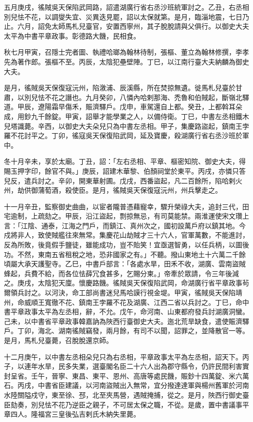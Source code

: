 \begin{pinyinscope}
 五月庚戌，徭賊吳天保陷武岡路，詔遣湖廣行省右丞沙班統軍討之。乙丑，右丞相別兒怯不花，以調燮失宜、災異迭見罷，詔以太保就第。是月，臨淄地震，七日乃止。六月，詔免太師馬札兒臺官，安置西寧州，其子脫脫請與父俱行。以御史大夫太平為中書平章政事。彰德路大饑，民相食。



 秋七月甲寅，召隱士完者圖、執禮哈瑯為翰林待制，張樞、董立為翰林修撰，李孝先為著作郎。張樞不至。丙辰，太陰犯壘壁陣。丁巳，以江南行臺大夫納麟為御史大夫。



 是月，徭賊吳天保復寇沅州，陷漵浦、辰溪縣，所在焚掠無遺。徙馬札兒臺於甘肅，以別兒怯不花之譖也。九月癸卯，八憐內哈剌那海、禿魯和伯賊起，斷嶺北驛道。甲辰，遼陽霜早傷禾，賑濟驛戶。戊申，車駕還自上都。癸丑，上都斡耳朵成，用鈔九千餘錠。甲寅，詔舉才能學業之人，以備侍衛。丁巳，中書左丞相鐵木兒塔識薨。辛西，以御史大夫朵兒只為中書左丞相。甲子，集慶路盜起，鎮南王孛羅不花討平之。丁卯，徭寇吳天保復陷武岡，延及寶慶，殺湖廣行省右丞沙班於軍中。



 冬十月辛未，享於太廟。丁丑，詔：「左右丞相、平章、樞密知院、御史大夫，得賜玉押字印，餘官不與。」庚辰，詔建木華黎、伯顏祠堂於東平。丙戌，亦憐只答兒反，遣兵討之。辛卯，開東華射圃。戊戌，西番盜起，凡二百餘所，陷哈剌火州，劫供御蒲萄酒，殺使臣。是月，徭賊吳天保復寇沅州，州兵擊走之。



 十一月辛丑，監察御史曲曲，以宦者隴普憑藉寵幸，驟升榮祿大夫，追封三代，田宅逾制，上疏劾之。甲辰，沿江盜起，剽掠無忌，有司莫能禁。兩淮運使宋文瓚上言：「江陰、通泰，江海之門戶，而鎮江、真州次之，國初設萬戶府以鎮其地。今戍將非人，致使賊艦往來無常。集慶花山劫賊才三十六人，官軍萬數，不能進討，反為所敗，後竟假手鹽徒，雖能成功，豈不貽笑！宜亟選智勇，以任兵柄，以圖後功。不然，東南五省租稅之地，恐非國家之有。」不聽。撥山東地土十六萬二千餘頃屬大承天護聖寺。乙巳，中書戶部言：「各處水旱，田禾不收，湖廣、雲南盜賊蜂起，兵費不給，而各位怯薛冗食甚多，乞賜分柬。」帝牽於眾請，令三年後減之。庚戌，太陰犯天廩。懷慶路饑。徭賊吳天保復陷武岡，命湖廣行省平章政事茍爾領兵討之。以河決，命工部尚書迷兒馬哈謨行視金堤。甲寅，徭賊吳天保陷靖州，命威順王寬徹不花、鎮南王孛羅不花及湖廣、江西二省以兵討之。丁巳，命中書平章政事太平為左丞相，辭，不允。戊午，命河南、山東都府發兵討湖廣洞蠻。己未，以中書省平章政事韓嘉訥為陜西行臺御史大夫。迤北荒旱缺食，遣使賑濟驛戶。丁卯，海北、湖南徭賊竊發，兩月餘，有司不以聞，詔罪之，並降散官一等。是月，馬札兒臺薨，召脫脫還京師。



 十二月庚午，以中書左丞相朵兒只為右丞相，平章政事太平為左丞相，詔天下。丙子，以連年水旱，民多失業，選臺閣名臣二十六人出為郡守縣令，仍許民間利害實封呈省。壬午，晉寧、東昌、東平、恩州、高唐等處民饑，賑鈔十四萬錠、米六萬石。丙戌，中書省臣建議，以河南盜賊出入無常，宜分撥達達軍與楊州舊軍於河南水陸關隘戍守，東至徐、邳，北至夾馬營，遇賊掩捕，從之。是月，陜西行御史臺臣劾奏，別兒怯不花乃逆臣之親子，不可居太保之職，不從。是歲，置中書議事平章四人。隆福宮三皇後弘吉剌氏木納失里薨。




\end{pinyinscope}

